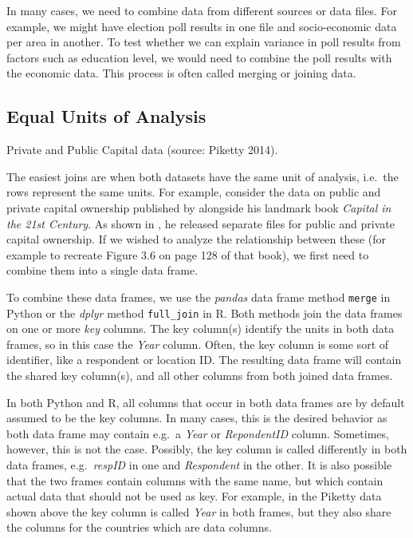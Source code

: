 {In many cases, we need to combine data from different sources or data files.
For example, we might have election poll results in one file and socio-economic data per area in another.
To test whether we can explain variance in poll results from factors such as education level,
we would need to combine the poll results with the economic data.
This process is often called merging or joining data.

\subsection{Equal Units of Analysis}

\begin{ccsexample}
\caption{Private and Public Capital data (source: Piketty 2014).}\label{ex:piketty}
\end{ccsexample}


The easiest joins are when both datasets have the same unit of analysis,
i.e.\ the rows represent the same units.
For example, consider the data on public and private capital ownership published by
\cite{piketty} alongside his landmark book \emph{Capital in the 21st Century}.
As shown in , he released separate files for public and private capital ownership.
If we wished to analyze the relationship between these (for example to recreate Figure 3.6 on page 128 of that book),
we first need to combine them into a single data frame.

To combine these data frames, we use the \emph{pandas} data frame method \texttt{merge} in Python or the \emph{dplyr} method \texttt{full\_join} in R.
Both methods join the data frames on one or more \emph{key} columns.
The key column(s) identify the units in both data frames, so in this case the \emph{Year} column.
Often, the key column is some sort of identifier, like a respondent or location ID.
The resulting data frame will contain the shared key column(s), and all other columns from both joined data frames.

In both Python and R, all columns that occur in both data frames are by default assumed to be the key columns.
In many cases, this is the desired behavior as both data frame may contain e.g.\ a \emph{Year} or \emph{RepondentID} column.
Sometimes, however, this is not the case.
Possibly, the key column is called differently in both data frames, e.g.\ \emph{respID} in one and \emph{Respondent} in the other.
It is also possible that the two frames contain columns with the same name,
but which contain actual data that should not be used as key.
For example, in the Piketty data shown above the key column is called \emph{Year} in both frames,
but they also share the columns for the countries which are data columns.

}

